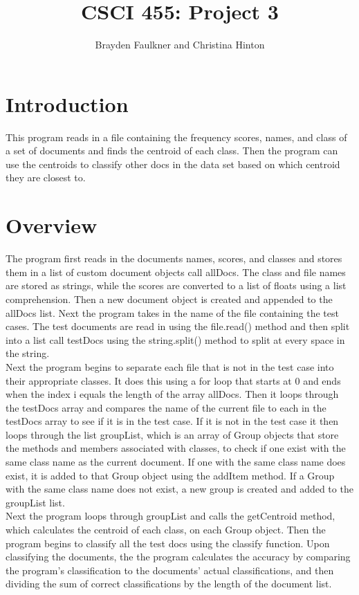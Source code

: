 \documentclass[12pt]{article}
\author{Brayden Faulkner and Christina Hinton}
\title{CSCI 455: Project 3}
\begin{document}
\maketitle
\section{Introduction}
\indent This program reads in a file containing the frequency scores, names, and class of a set of documents and finds the centroid of each class. Then the program can use the centroids to classify other docs in the data set based on which centroid they are closest to.
\section{Overview}
\indent The program first reads in the documents names, scores, and classes and stores them in a list of custom document objects call allDocs. The class and file names are stored as strings, while the scores are converted to a list of floats using a list comprehension. Then a new document object is created and appended to the allDocs list. Next the program takes in the name of the file containing the test cases. The test documents are read in using the file.read() method and then split into a list call testDocs using the string.split() method to split at every space in the string. \\
\indent Next the program begins to separate each file that is not in the test case into their appropriate classes. It does this using a for loop that starts at 0 and ends when the index i equals the length of the array allDocs. Then it loops through the testDocs array and compares the name of the current file to each in the testDocs array to see if it is in the test case. If it is not in the test case it then loops through the list groupList, which is an array of Group objects that store the methods and members associated with classes, to check if one exist with the same class name as the current document. If one with the same class name does exist, it is added to that Group object using the addItem method. If a Group with the same class name does not exist, a new group is created and added to the groupList list. \\
\indent Next the program loops through groupList and calls the getCentroid method, which calculates the centroid of each class, on each Group object. Then the program begins to classify all the test docs using the classify function. Upon classifying the documents, the the program calculates the accuracy by comparing the program's classification to the documents' actual classifications, and then dividing the sum of correct classifications by the length of the document list. \\
\end{document}
